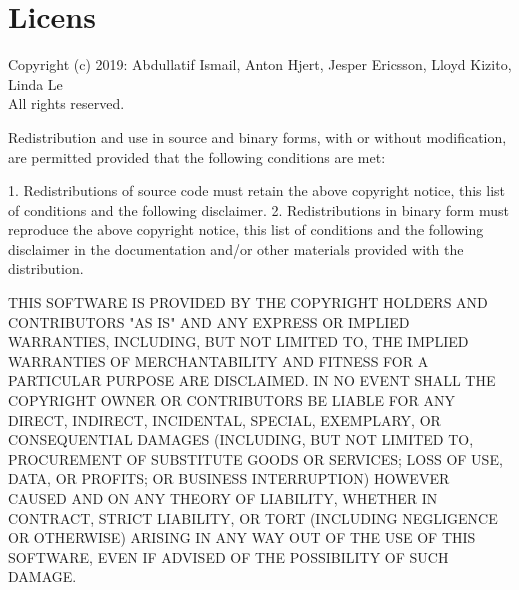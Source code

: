 \section{Licens}
\label{ref:licens}
Copyright (c) 2019: Abdullatif Ismail, Anton Hjert, Jesper Ericsson, Lloyd Kizito, Linda Le \\All rights reserved.

Redistribution and use in source and binary forms, with or without
modification, are permitted provided that the following conditions are met:

1. Redistributions of source code must retain the above copyright notice, this list of conditions and the following disclaimer.
2. Redistributions in binary form must reproduce the above copyright notice, this list of conditions and the following disclaimer in the documentation and/or other materials provided with the distribution.

THIS SOFTWARE IS PROVIDED BY THE COPYRIGHT HOLDERS AND CONTRIBUTORS "AS IS" AND ANY EXPRESS OR IMPLIED WARRANTIES, INCLUDING,
BUT NOT LIMITED TO, THE IMPLIED WARRANTIES OF MERCHANTABILITY AND FITNESS FOR A PARTICULAR PURPOSE ARE DISCLAIMED. IN NO EVENT
SHALL THE COPYRIGHT OWNER OR CONTRIBUTORS BE LIABLE FOR ANY DIRECT, INDIRECT, INCIDENTAL, SPECIAL, EXEMPLARY, OR CONSEQUENTIAL
DAMAGES (INCLUDING, BUT NOT LIMITED TO, PROCUREMENT OF SUBSTITUTE GOODS OR SERVICES; LOSS OF USE, DATA, OR PROFITS; OR BUSINESS
INTERRUPTION) HOWEVER CAUSED AND ON ANY THEORY OF LIABILITY, WHETHER IN CONTRACT, STRICT LIABILITY, OR TORT (INCLUDING
NEGLIGENCE OR OTHERWISE) ARISING IN ANY WAY OUT OF THE USE OF THIS SOFTWARE, EVEN IF ADVISED OF THE POSSIBILITY OF SUCH DAMAGE.
